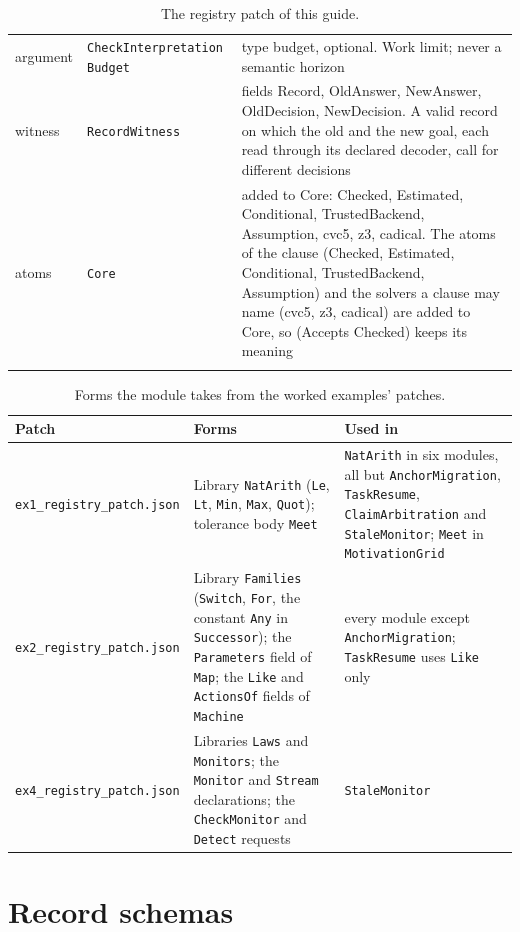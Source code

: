 \documentclass[11pt]{article}
\newcommand{\fpath}[1]{\nolinkurl{#1}}
\newcommand{\code}[1]{\texttt{#1}}
\theoremstyle{definition}
\theoremstyle{plain}
\begin{document}
\begin{footnotesize}
\begin{longtable}{>{\raggedright\arraybackslash}p{2.0cm}>{\raggedright\arraybackslash}p{3.6cm}>{\raggedright\arraybackslash}p{8.6cm}}
argument & \code{CheckInterpretation Budget} & type budget, optional. Work limit; never a semantic horizon\\
witness & \code{RecordWitness} & fields Record, OldAnswer, NewAnswer, OldDecision, NewDecision. A valid record on which the old and the new goal, each read through its declared decoder, call for different decisions\\
atoms & \code{Core} & added to Core:\allowbreak{} Checked, Estimated, Conditional, TrustedBackend, Assumption, cvc5, z3, cadical. The atoms of the clause (Checked, Estimated, Conditional, TrustedBackend, Assumption) and the solvers a clause may name (cvc5, z3, cadical) are added to Core, so (Accepts Checked) keeps its meaning\\
\bottomrule
\caption{The registry patch of this guide.}\label{tab:patch}
\end{longtable}
\end{footnotesize}

\begin{table}[ht]
\centering\footnotesize
\begin{tabularx}{\textwidth}{>{\raggedright\arraybackslash}p{2.5cm}>{\raggedright\arraybackslash}X>{\raggedright\arraybackslash}p{4.6cm}}
\toprule
Patch & Forms & Used in\\
\midrule
\fpath{ex1_registry_patch.json} & Library \code{NatArith} (\code{Le}, \code{Lt}, \code{Min},
\code{Max}, \code{Quot}); tolerance body \code{Meet} & \code{NatArith} in six modules, all but
\code{AnchorMigration}, \code{TaskResume}, \code{ClaimArbitration} and \code{StaleMonitor};
\code{Meet} in \code{MotivationGrid}\\
\fpath{ex2_registry_patch.json} & Library \code{Families} (\code{Switch}, \code{For}, the constant
\code{Any} in \code{Successor}); the \code{Parameters} field of \code{Map}; the \code{Like} and
\code{ActionsOf} fields of \code{Machine} & every module except \code{AnchorMigration};
\code{TaskResume} uses \code{Like} only\\
\fpath{ex4_registry_patch.json} & Libraries \code{Laws} and \code{Monitors}; the \code{Monitor} and
\code{Stream} declarations; the \code{CheckMonitor} and \code{Detect} requests &
\code{StaleMonitor}\\
\bottomrule
\end{tabularx}
\caption{Forms the module takes from the worked examples' patches.}\label{tab:reused}
\end{table}
\section{Record schemas}\label{app:records}
\end{document}
